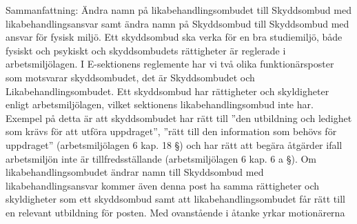 \documentclass[../_main/handlingar.tex]{subfiles}
\begin{document}
Sammanfattning: Ändra namn på likabehandlingsombudet till Skyddsombud med
likabehandlingsansvar samt ändra namn på Skyddsombud till Skyddsombud med ansvar för fysisk miljö.
Ett skyddsombud ska verka för en bra studiemiljö, både fysiskt och psykiskt och
skyddsombudets rättigheter är reglerade i arbetsmiljölagen. I E-sektionens reglemente har vi två olika funktionärsposter som motsvarar skyddsombudet, det är Skyddsombudet och Likabehandlingsombudet. Ett skyddsombud har rättigheter och skyldigheter enligt arbetsmiljölagen, vilket sektionens likabehandlingsombud inte har. Exempel på detta är att skyddsombudet har rätt till ”den utbildning och ledighet som krävs för att utföra uppdraget”,
”rätt till den information som behövs för uppdraget” (arbetsmiljölagen 6 kap. 18 §) och har rätt att begära åtgärder ifall arbetsmiljön inte är tillfredsställande (arbetsmiljölagen 6 kap. 6 a §).
Om likabehandlingsombudet ändrar namn till Skyddsombud med likabehandlingsansvar
kommer även denna post ha samma rättigheter och skyldigheter som ett skyddsombud samt att likabehandlingsombudet får rätt till en relevant utbildning för posten. Med ovanstående i åtanke yrkar motionärerna
\end{document}
